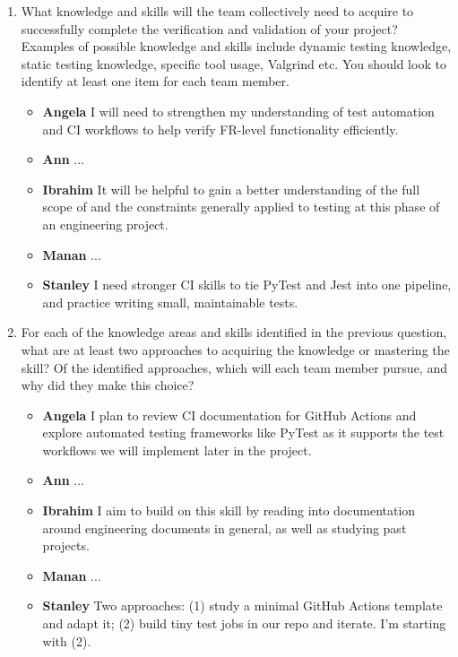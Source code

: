 \documentclass[12pt, titlepage]{article}
\begin{document}
\begin{enumerate}
  \item What knowledge and skills will the team collectively need to acquire to
  successfully complete the verification and validation of your project?
  Examples of possible knowledge and skills include dynamic testing knowledge,
  static testing knowledge, specific tool usage, Valgrind etc.  You should look to
  identify at least one item for each team member.
  \begin{itemize}
      \item \textbf{Angela} I will need to strengthen my understanding of test automation and CI workflows to help verify FR-level functionality efficiently.
      \item \textbf{Ann} ...
      \item \textbf{Ibrahim} It will be helpful to gain a better understanding of the full scope of and the constraints generally applied to testing at this phase of an engineering project.
      \item \textbf{Manan} ...
      \item \textbf{Stanley} I need stronger CI skills to tie PyTest and Jest into one pipeline, and practice writing small, maintainable tests.
    \end{itemize}

  \item For each of the knowledge areas and skills identified in the previous
  question, what are at least two approaches to acquiring the knowledge or
  mastering the skill?  Of the identified approaches, which will each team
  member pursue, and why did they make this choice?
  \begin{itemize}
      \item \textbf{Angela} I plan to review CI documentation for GitHub Actions and explore automated testing frameworks like PyTest as it supports the test workflows we will implement later in the project.
      \item \textbf{Ann} ...
      \item \textbf{Ibrahim} I aim to build on this skill by reading into documentation around engineering documents in general, as well as studying past projects.
      \item \textbf{Manan} ...
      \item \textbf{Stanley} Two approaches: (1) study a minimal GitHub Actions template and adapt it; (2) build tiny test jobs in our repo and iterate. I’m starting with (2).
    \end{itemize}

\end{enumerate}
\end{document}
